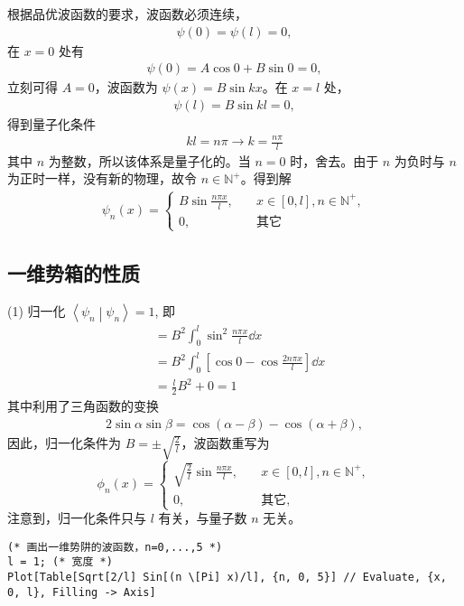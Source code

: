 根据品优波函数的要求，波函数必须连续，
\begin{eqnarray}
    \psi(0) = \psi(l) = 0,
\end{eqnarray}
在 $x=0$ 处有
\begin{eqnarray}
    \psi(0) = A \cos 0 + B \sin 0 = 0,
\end{eqnarray}
立刻可得 $A = 0$，波函数为 $\psi(x) = B \sin kx$。在 $x=l$ 处，
\begin{eqnarray}
    \psi(l) = B \sin kl = 0,
\end{eqnarray}
得到量子化条件
\begin{eqnarray}
    k l = n \pi \rightarrow k = \frac{n\pi}{l}
\end{eqnarray}
其中 $n$ 为整数，所以该体系是量子化的。当 $n=0$ 时，舍去。由于 $n$ 为负时与 $n$ 为正时一样，没有新的物理，故令 $n \in \mathbb{N}^+$。得到解
\begin{eqnarray}
    \psi_n(x) = 
    \begin{cases}
        B \sin \frac{n\pi x}l, \quad &x \in [0,l], n\in\mathbb{N}^+, \\
        0,\quad &\text{其它}
    \end{cases}
\end{eqnarray}

\subsection{一维势箱的性质}

(1) 归一化 $\left\langle \psi_n \middle | \psi_n \right\rangle = 1$, 即
\begin{align}
    &= B^2 \int_0^l \sin^2 \frac{n\pi x}{l} \dd x \\
    &=  B^2 \int_0^l \left[\cos 0 - \cos \frac{2 n \pi x}l \right] \dd x \\
    &= \frac l2 B^2 + 0 = 1
\end{align}
其中利用了三角函数的变换
\begin{eqnarray}
    2\sin\alpha \sin\beta = \cos(\alpha-\beta) - \cos(\alpha+\beta),
\end{eqnarray}
因此，归一化条件为 $B = \pm \sqrt{\frac2l}$，波函数重写为
\begin{equation}
    \phi_n(x) = \begin{cases}\displaystyle
        \sqrt{\frac 2l} \sin\frac{n\pi x}l, \quad &x\in[0,l], n\in \mathbb{N}^+,\\
        0, \quad&\text{其它},
    \end{cases}
\end{equation}
注意到，归一化条件只与 $l$ 有关，与量子数 $n$ 无关。
\begin{lstlisting}
(* 画出一维势阱的波函数，n=0,...,5 *)
l = 1; (* 宽度 *)
Plot[Table[Sqrt[2/l] Sin[(n \[Pi] x)/l], {n, 0, 5}] // Evaluate, {x, 0, l}, Filling -> Axis]
\end{lstlisting}

